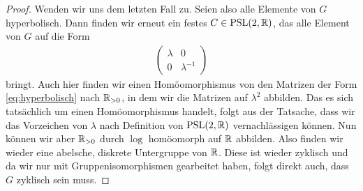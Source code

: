 \begin{proof}
  Wenden wir uns dem letzten Fall zu. Seien also alle Elemente von $G$
  hyperbolisch. Dann finden wir erneut ein festes $C \in \operatorname{PSL}(2, \mathbb{R})$,
  das alle Element von $G$ auf die Form
  \begin{align}
    \label{eq:hyperbolisch}
  \begin{pmatrix}
    \lambda & 0 \\
    0 & \lambda^{-1}
  \end{pmatrix}
  \end{align}
  bringt. Auch hier finden wir einen Homöomorphismus von den Matrizen
  der Form \eqref{eq:hyperbolisch} nach $\mathbb{R}_{> 0}$, in
  dem wir die Matrizen auf $\lambda^2$ abbilden. Das es sich
  tatsächlich um einen Homöomorphismus handelt, folgt aus der
  Tatsache, dass wir das Vorzeichen von $\lambda$ nach Definition von
  $\operatorname{PSL}(2, \mathbb{R})$ vernachlässigen können. Nun können wir aber $\mathbb{R}_{> 0}$
  durch $\log$ homöomorph auf $\mathbb{R}$ abbilden. Also finden wir wieder
  eine abelsche, diskrete Untergruppe von $\mathbb{R}$. Diese ist wieder
  zyklisch und da wir nur mit Gruppenisomorphismen gearbeitet haben, folgt
  direkt auch, dass $G$ zyklisch sein muss.
\end{proof}

